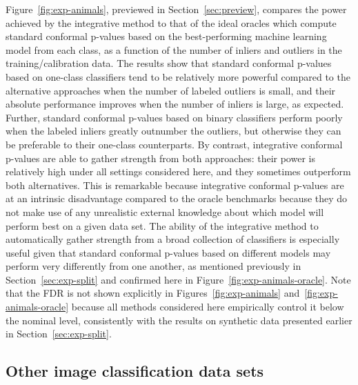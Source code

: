 \documentclass[11pt]{article}
\begin{document}
Figure~\ref{fig:exp-animals}, previewed in Section~\ref{sec:preview}, compares the power achieved by the integrative method to that of the ideal oracles which compute standard conformal p-values based on the best-performing machine learning model from each class, as a function of the number of inliers and outliers in the training/calibration data.
The results show that standard conformal p-values based on one-class classifiers tend to be relatively more powerful compared to the alternative approaches when the number of labeled outliers is small, and their absolute performance improves when the number of inliers is large, as expected. Further, standard conformal p-values based on binary classifiers perform poorly when the labeled inliers greatly outnumber the outliers, but otherwise they can be preferable to their one-class counterparts. By contrast, integrative conformal p-values are able to gather strength from both approaches: their power is relatively high under all settings considered here, and they sometimes outperform both alternatives.
This is remarkable because integrative conformal p-values are at an intrinsic disadvantage compared to the oracle benchmarks because they do not make use of any unrealistic external knowledge about which model will perform best on a given data set.
The ability of the integrative method to automatically gather strength from a broad collection of classifiers is especially useful given that standard conformal p-values based on different models may perform very differently from one another, as mentioned previously in Section~\ref{sec:exp-split} and confirmed here in Figure~\ref{fig:exp-animals-oracle}.
Note that the FDR is not shown explicitly in Figures~\ref{fig:exp-animals} and~\ref{fig:exp-animals-oracle} because all methods considered here empirically control it below the nominal level, consistently with the results on synthetic data presented earlier in Section~\ref{sec:exp-split}.


\subsection{Other image classification data sets} \label{sec:real-data-images}
\end{document}
